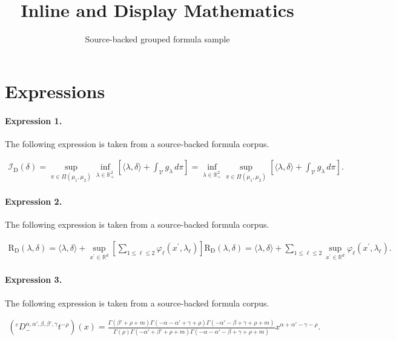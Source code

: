 \documentclass[11pt]{article}
\title{Inline and Display Mathematics}
\author{Source-backed grouped formula sample}
\date{}
\begin{document}
\maketitle
\section{Expressions}
\paragraph{Expression 1.} The following expression is taken from a source-backed formula corpus.

\begin{align*}\mathcal{I}_{\mathrm{D}} (\delta) = \sup _{\pi \in \Pi\left(\mu_1, \mu_2\right)} \inf _{\lambda \in \mathbb{R}_{+}^2}\left[\langle\lambda, \delta\rangle+\int_{\mathcal{V}} g_\lambda \, d \pi\right] = \inf _{\lambda \in \mathbb{R}_{+}^2} \sup _{\pi \in \Pi\left(\mu_1, \mu_2\right)} \left[\langle\lambda, \delta\rangle+\int_{\mathcal{V}} g_\lambda \, d \pi\right].\end{align*}

\paragraph{Expression 2.} The following expression is taken from a source-backed formula corpus.

\begin{align*}\mathrm{R}_{\mathrm{D}}(\lambda, \delta) = \langle\lambda, \delta\rangle+ \sup _{x^{\prime} \in \mathbb{R}^d} \left[ \sum_{1\leq \ell \leq 2} \varphi_\ell(x^{\prime}, \lambda_\ell)\right] \mathrm{R}_{\mathrm{D}}(\lambda, \delta) = \langle\lambda, \delta\rangle+ \sum_{1\leq \ell \leq 2} \sup _{x^{\prime} \in \mathbb{R}^d}\varphi_\ell(x^{\prime}, \lambda_\ell).\end{align*}

\paragraph{Expression 3.} The following expression is taken from a source-backed formula corpus.

\begin{align*}\left({}^{c}D_{-}^{\alpha,\alpha',\beta,\beta',\gamma}t^{-\rho}\right)(x)=\frac{\Gamma\left(\beta'+\rho+m\right)\Gamma\left(-\alpha-\alpha'+\gamma+\rho\right)\Gamma\left(-\alpha'-\beta+\gamma+\rho+m\right)}{\Gamma\left(\rho\right)\Gamma\left(-\alpha'+\beta'+\rho+m\right)\Gamma\left(-\alpha-\alpha'-\beta+\gamma+\rho+m\right)}x^{\alpha+\alpha'-\gamma-\rho}.\end{align*}
\end{document}
